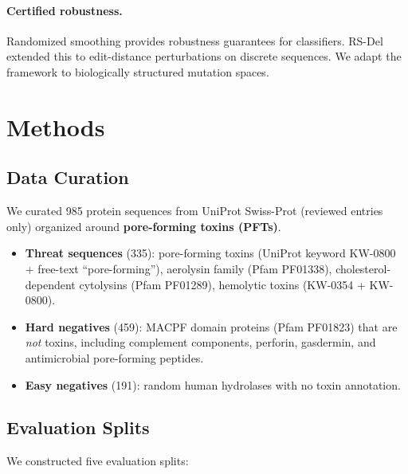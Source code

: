 \documentclass[11pt,a4paper]{article}
\begin{document}
\paragraph{Certified robustness.}
Randomized smoothing \cite{cohen2019certified} provides robustness guarantees for classifiers. RS-Del \cite{huang2023rsdel} extended this to edit-distance perturbations on discrete sequences. We adapt the framework to biologically structured mutation spaces.

\section{Methods}

\subsection{Data Curation}

We curated 985 protein sequences from UniProt Swiss-Prot (reviewed entries only) organized around \textbf{pore-forming toxins (PFTs)}.

\begin{itemize}[leftmargin=*]
    \item \textbf{Threat sequences} (335): pore-forming toxins (UniProt keyword KW-0800 + free-text ``pore-forming''), aerolysin family (Pfam PF01338), cholesterol-dependent cytolysins (Pfam PF01289), hemolytic toxins (KW-0354 + KW-0800).
    \item \textbf{Hard negatives} (459): MACPF domain proteins (Pfam PF01823) that are \emph{not} toxins, including complement components, perforin, gasdermin, and antimicrobial pore-forming peptides.
    \item \textbf{Easy negatives} (191): random human hydrolases with no toxin annotation.
\end{itemize}

\subsection{Evaluation Splits}

We constructed five evaluation splits:
\end{document}

